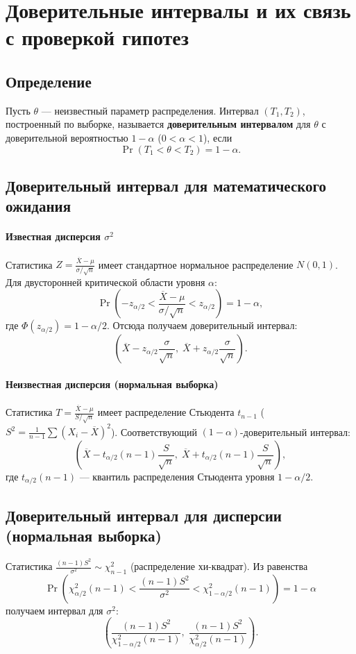 \documentclass[10pt]{article}
\begin{document}
\section{Доверительные интервалы и их связь с проверкой гипотез}

\subsection{Определение}
Пусть $\theta$ — неизвестный параметр распределения. Интервал $(T_1, T_2)$, построенный по выборке, называется \textbf{доверительным интервалом} для $\theta$ с доверительной вероятностью $1-\alpha$ ($0<\alpha<1$), если
\[
\Pr(T_1 < \theta < T_2) = 1-\alpha.
\]

\subsection{Доверительный интервал для математического ожидания}

\paragraph{Известная дисперсия $\sigma^2$}
Статистика $Z = \frac{\overline{X} - \mu}{\sigma/\sqrt{n}}$ имеет стандартное нормальное распределение $N(0,1)$. Для двусторонней критической области уровня $\alpha$:
\[
\Pr\!\left(-z_{\alpha/2} < \frac{\overline{X} - \mu}{\sigma/\sqrt{n}} < z_{\alpha/2}\right) = 1-\alpha,
\]
где $\Phi(z_{\alpha/2}) = 1-\alpha/2$. Отсюда получаем доверительный интервал:
\[
\left(\overline{X} - z_{\alpha/2}\frac{\sigma}{\sqrt{n}},\; \overline{X} + z_{\alpha/2}\frac{\sigma}{\sqrt{n}}\right).
\]

\paragraph{Неизвестная дисперсия (нормальная выборка)}
Статистика $T = \frac{\overline{X} - \mu}{S/\sqrt{n}}$ имеет распределение Стьюдента $t_{n-1}$ ($S^2 = \frac{1}{n-1}\sum (X_i-\overline{X})^2$). Соответствующий $(1-\alpha)$-доверительный интервал:
\[
\left(\overline{X} - t_{\alpha/2}(n-1)\frac{S}{\sqrt{n}},\; \overline{X} + t_{\alpha/2}(n-1)\frac{S}{\sqrt{n}}\right),
\]
где $t_{\alpha/2}(n-1)$ — квантиль распределения Стьюдента уровня $1-\alpha/2$.

\subsection{Доверительный интервал для дисперсии (нормальная выборка)}
Статистика $\frac{(n-1)S^2}{\sigma^2} \sim \chi^2_{n-1}$ (распределение хи-квадрат). Из равенства
\[
\Pr\!\left(\chi^2_{\alpha/2}(n-1) < \frac{(n-1)S^2}{\sigma^2} < \chi^2_{1-\alpha/2}(n-1)\right) = 1-\alpha
\]
получаем интервал для $\sigma^2$:
\[
\left(\frac{(n-1)S^2}{\chi^2_{1-\alpha/2}(n-1)},\; \frac{(n-1)S^2}{\chi^2_{\alpha/2}(n-1)}\right).
\]
\end{document}
